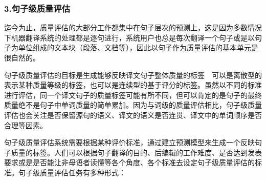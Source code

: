 
\subsubsection{3.句子级质量评估}

\parinterval 迄今为止，质量评估的大部分工作都集中在句子层次的预测上，这是因为多数情况下机器翻译系统的处理都是逐句进行，系统用户也总是每次翻译一个句子或是以句子为单位组成的文本块（段落、文档等），因此以句子作为质量评估的基本单元是很自然的。

\parinterval 句子级质量评估的目标是生成能够反映译文句子整体质量的标签\ \dash \ 可以是离散型的表示某种质量等级的标签，也可以是连续型的基于评分的标签。虽然以不同的标准进行评估，同一个译文句子的质量标签可能有所不同，但可以肯定的是句子的最终质量绝不是句子中单词质量的简单累加。因为与词级的质量评估相比，句子级质量评估也会关注是否保留源句的语义、译文的语义是否连贯、译文中的单词顺序是否合理等因素。

\parinterval 句子级质量评估系统需要根据某种评价标准，通过建立预测模型来生成一个反映句子质量的标签。人们可以根据句子翻译的目的、后编辑的工作难度、是否达到发表要求或是是否能让非母语者读懂等各个角度、各个标准去设定句子级质量评估的标准。句子级质量评估任务有多种形式：

